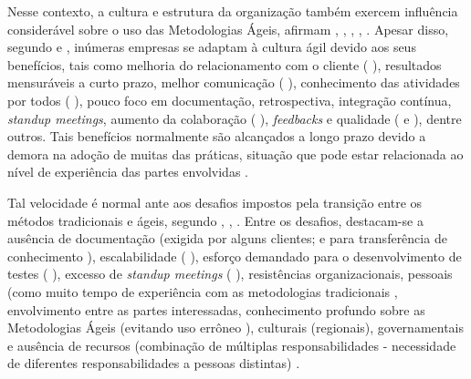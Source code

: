 Nesse contexto, a cultura e estrutura da organização também exercem influência considerável sobre o uso das Metodologias Ágeis, afirmam \citeauthor{Asnawi2012} \citeyear{Asnawi2012}, \citeauthor{Senapathi2014} \citeyear{Senapathi2014}, \citeauthor{Lazwanthi2016} \citeyear{Lazwanthi2016}, \citeauthor{B2016} \citeyear{B2016}, \citeauthor{Laanti2011} \citeyear{Laanti2011}. Apesar disso, segundo \citeauthor{Lazwanthi2016} \citeyear{Lazwanthi2016} e \citeauthor{Asnawi2012} \citeyear{Asnawi2012}, inúmeras empresas se adaptam à cultura ágil devido aos seus benefícios, tais como melhoria do relacionamento com o cliente (\citeauthor{Solinski2016} \citeyear{Solinski2016}), resultados mensuráveis a curto prazo, melhor comunicação (\citeauthor{Murphy2013} \citeyear{Murphy2013}), conhecimento das atividades por todos (\citeauthor{Murphy2013} \citeyear{Murphy2013}), pouco foco em documentação, retrospectiva, integração contínua, \textit{standup meetings}, aumento da colaboração (\citeauthor{B2016} \citeyear{B2016}), \textit{feedbacks} e qualidade (\citeauthor{Solinski2016} \citeyear{Solinski2016} e \citeauthor{Murphy2013} \citeyear{Murphy2013}), dentre outros. Tais benefícios normalmente são alcançados a longo prazo devido a demora na adoção de muitas das práticas, situação que pode estar relacionada ao nível de experiência das partes envolvidas \citeauthor{B2016} \citeyear{B2016}. 

Tal velocidade é normal ante aos desafios impostos pela transição entre os métodos tradicionais e ágeis, segundo \citeauthor{Lazwanthi2016} \citeyear{Lazwanthi2016}, \citeauthor{B2016} \citeyear{B2016}, \citeauthor{Laanti2011} \citeyear{Laanti2011}. Entre os desafios, destacam-se a ausência de documentação (exigida por alguns clientes; e para transferência de conhecimento \citeauthor{Asnawi2011} \citeyear{Asnawi2011}), escalabilidade (\citeauthor{Solinski2016} \citeyear{Solinski2016}), esforço demandado para o desenvolvimento de testes (\citeauthor{Solinski2016} \citeyear{Solinski2016}), excesso de \textit{standup meetings} (\citeauthor{Murphy2013} \citeyear{Murphy2013}), resistências organizacionais, pessoais (como muito tempo de experiência com as metodologias tradicionais \citeauthor{Laanti2011} \citeyear{Laanti2011}, envolvimento entre as partes interessadas, conhecimento profundo sobre as Metodologias Ágeis (evitando uso errôneo \citeauthor{Murphy2013} \citeyear{Murphy2013}), culturais (regionais), governamentais e ausência de recursos (combinação de múltiplas responsabilidades - necessidade de diferentes responsabilidades a pessoas distintas) \citeauthor{Asnawi2012} \citeyear{Asnawi2012}.

